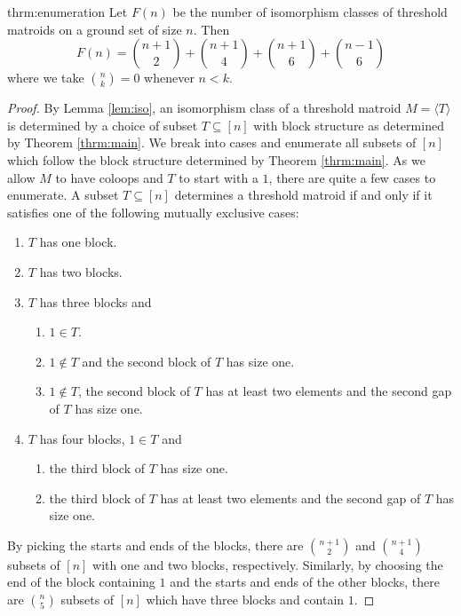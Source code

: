 \documentclass[10pt,a4paper]{amsart}
\theoremstyle{definition}
\theoremstyle{plain}
\begin{document}
\begin{repintrotheorem}{thrm:enumeration}
Let $F(n)$ be the number of isomorphism classes of threshold matroids on a ground set of size $n$. Then
\[F(n) = \binom{n+1}{2} + \binom{n+1}{4}+ \binom{n+1}{6} + \binom{n-1}{6}\]
where we take $\binom{n}{k}=0$ whenever $n<k$.
\end{repintrotheorem}
\begin{proof}
  By Lemma \ref{lem:iso}, an isomorphism class of a threshold matroid $M=\langle T \rangle $ is determined by a choice of subset $T\subseteq [n]$ with block structure as determined by Theorem \ref{thrm:main}. We break into cases and enumerate all subsets of $[n]$ which follow the block structure determined by Theorem \ref{thrm:main}. As we allow $M$ to have coloops and $T$ to start with a $1$, there are quite a few cases to enumerate. A subset $T\subseteq [n]$ determines a threshold matroid if and only if it satisfies one of the following mutually exclusive cases:
  \begin{enumerate}
  \item $T$ has one block.
  \item $T$ has two blocks.
  \item $T$ has three blocks and
 \begin{enumerate}
 \item $1\in T$.
 \item \label{case:3b} $1\not\in T$ and the second block of $T$ has size one.
 \item \label{case:3c}$1\not\in T$, the second block of $T$ has at least two elements and the second gap of $T$ has size one.
 \end{enumerate} 
 \item $T$ has four blocks, $1\in T$ and
  \begin{enumerate}
  \item \label{case:4a}the third block of $T$ has size one.
  \item \label{case:4b}the third block of $T$ has at least two elements and the second gap of $T$ has size one.
  \end{enumerate}
 \end{enumerate}

 By picking the starts and ends of the blocks, there are $\binom{n+1}{2}$ and $\binom{n+1}{4}$ subsets of $[n]$ with one and two blocks, respectively. Similarly, by choosing the end of the block containing $1$ and the starts and ends of the other blocks, there are $\binom{n}{5}$ subsets of $[n]$ which have three blocks and contain $1$.


\end{proof}
\end{document}
